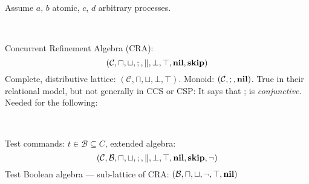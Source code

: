 \newpage
{}


Assume $a$, $b$ atomic, $c$, $d$ arbitrary processes.

~

Concurrent Refinement Algebra (CRA):
\[
(\mathcal C,\sqcap,\sqcup,;,\parallel,\bot,\top,\mathbf{nil},\mathbf{skip})
\]
Complete, distributive lattice:
$
(\mathcal C,\sqcap,\sqcup,\bot,\top)
$.
Monoid:
$
  (\mathcal C, ;, \mathbf{nil})
$.
True in their relational model, but not generally in CCS or CSP:
It says that ; is \emph{conjunctive}.
Needed for the following:

~

Test commands: $t \in \mathcal B \subseteq C$, extended algebra:
\[
(\mathcal C,\mathcal B,\sqcap,\sqcup,;,\parallel,\bot,\top,\mathbf{nil},\mathbf{skip},\lnot)
\]
Test Boolean algebra --- sub-lattice of CRA:
$
(\mathcal B,\sqcap,\sqcup,\lnot,\top,\mathbf{nil})
$

